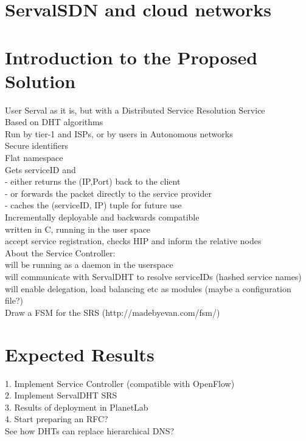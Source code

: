 \documentclass[12pt,a4paper,oneside]{article}
\begin{document}
\newpage
\section{ServalSDN and cloud networks}


\newpage
\section{Introduction to the Proposed Solution}
User Serval as it is, but with a Distributed Service Resolution Service
\\Based on DHT algorithms
\\Run by tier-1 and ISPs, or by users in Autonomous networks
\\Secure identifiers
\\Flat namespace
\\Gets serviceID and
\\- either returns the (IP,Port) back to the client
\\- or forwards the packet directly to the service provider
\\- caches the (serviceID, IP) tuple for future use
\\Incrementally deployable and backwards compatible
\\written in C, running in the user space
\\accept service registration, checks HIP and inform the relative nodes
\\About the Service Controller:
\\will be running as a daemon in the userspace
\\will communicate with ServalDHT to resolve serviceIDs (hashed service names)
\\will enable delegation, load balancing etc as modules (maybe a configuration file?)
\\Draw a FSM for the SRS  (http://madebyevan.com/fsm/)


\newpage
\section{Expected Results}
1. Implement Service Controller (compatible with OpenFlow)
\\2. Implement ServalDHT SRS
\\3. Results of deployment in PlanetLab
\\4. Start preparing an RFC?
\\See how DHTs can replace hierarchical DNS?
\end{document}
